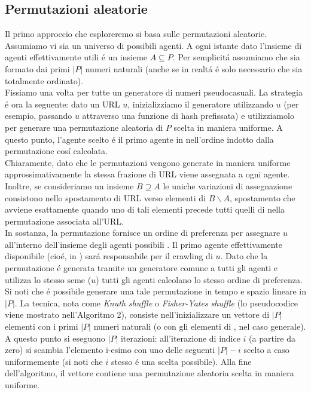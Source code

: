 \subsection{Permutazioni aleatorie}
Il primo approccio che esploreremo si basa sulle permutazioni aleatorie. Assumiamo vi sia un universo  di possibili agenti. A ogni istante dato l'insieme di agenti effettivamente utili é un insieme $A \subseteq P$. Per semplicitá assumiamo che  sia formato dai primi $|P|$ numeri naturali (anche se in realtá é solo necessario che  sia totalmente ordinato).\\
Fissiamo una volta per tutte un generatore di numeri pseudocasuali. La strategia é ora la seguente: dato un URL $u$, inizializziamo il generatore utilizzando $u$ (per esempio, passando $u$ attraverso una funzione di hash prefissata) e utilizziamolo per generare una permutazione aleatoria di $P$ scelta in maniera uniforme. A questo punto, l'agente scelto é il primo agente in  nell'ordine indotto dalla permutazione cosí calcolata.\\
Chiaramente, dato che le permutazioni vengono generate in maniera uniforme approssimativamente la stessa frazione di URL viene assegnata a ogni agente. Inoltre, se consideriamo un insieme $B \supseteq A$ le uniche variazioni di assegnazione consistono nello spostamento di URL verso elementi di $B \smallsetminus A$, spostamento che avviene esattamente quando uno di tali elementi precede tutti quelli di  nella permutazione associata all'URL.\\
In sostanza, la permutazione fornisce un ordine di preferenza per assegnare $u$ all'interno dell'insieme degli agenti possibili . Il primo agente effettivamente disponibile (cioé, in ) sará responsabile per il crawling di $u$. Dato che la permutazione é generata tramite un generatore comune a tutti gli agenti e utilizza lo stesso seme ($u$) tutti gli agenti calcolano lo stesso ordine di preferenza.\\
Si noti che é possibile generare una tale permutazione in tempo e spazio lineare in $|P|$. La tecnica, nota come \textit{Knuth shuffle} o \textit{Fisher-Yates shuffle} (lo pseudocodice viene mostrato nell'Algoritmo 2), consiste nell'inizializzare un vettore di $|P|$ elementi con i primi $|P|$ numeri naturali (o con gli elementi di , nel caso generale).\\
A questo punto si eseguono $|P|$ iterazioni: all'iterazione di indice $i$ (a partire da zero) si scambia l'elemento i-esimo con uno delle seguenti $|P| - i$ scelto a caso uniformemente (si noti che $i$ stesso é una scelta possibile). Alla fine dell'algoritmo, il vettore contiene una permutazione aleatoria scelta in maniera uniforme.
